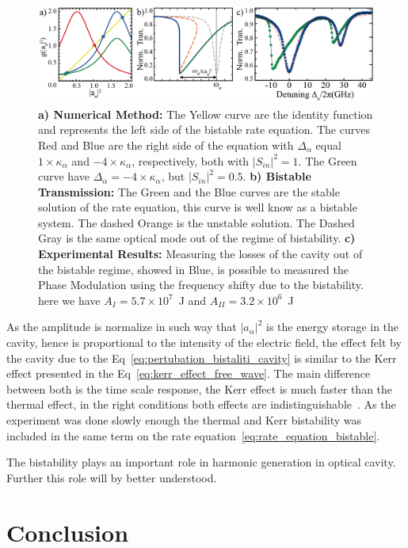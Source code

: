 \begin{figure}[t]
    \centering
    \includegraphics[width = 16cm]{Dissertation_bistabilite.jpg}
    \caption{\textbf{a) Numerical Method:} The Yellow curve are the identity function and represents the left side of the bistable rate equation. The curves Red and Blue are the right side of the equation with $\Delta_\alpha$ equal $1\times\kappa_\alpha$ and $-4\times\kappa_\alpha$, respectively, both with $|S_{in}|^2 = 1$. The Green curve have $\Delta_\alpha = -4\times\kappa_\alpha$, but $|S_{in}|^2 = 0.5$. \textbf{b) Bistable Transmission:} The Green and the Blue curves are the stable solution of the rate equation, this curve is well know as a bistable system. The dashed Orange is the unstable solution. The Dashed Gray is the same optical mode out of the regime of bistability. \textbf{c) Experimental Results:} Measuring the losses of the cavity out of the bistable regime, showed in Blue, is possible to measured the Phase Modulation using the frequency shifty due to the bistability. here we have $A_{I} = 5.7\times10^{7}$~J and $A_{II} = 3.2\times10^{6}$~J}
    \label{fig:bistable}
\end{figure}

As the amplitude is normalize in such way that $|a_\alpha|^2$ is the energy storage in the cavity, hence is proportional to the intensity of the electric field, the effect felt by the cavity due to the Eq~\ref{eq:pertubation_bistaliti_cavity} is similar to the Kerr effect presented in the Eq~\ref{eq:kerr_effect_free_wave}. The main difference between both is the time scale response, the Kerr effect is much faster than the thermal effect, in the right conditions both effects are indistinguishable~\cite{Braginsky89}. As the experiment was done slowly enough the thermal and Kerr bistability was included in the same term on the rate equation~\ref{eq:rate_equation_bistable}.

The bistability plays an important role in harmonic generation in optical cavity. Further this role will by better understood.  

\section{Conclusion}

